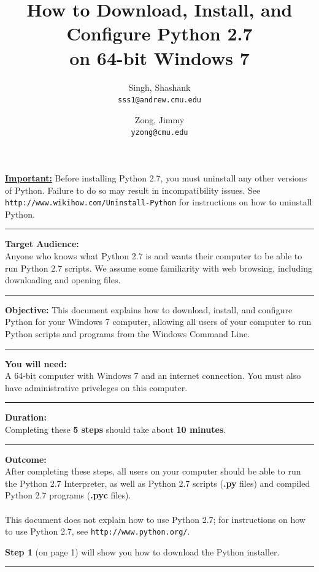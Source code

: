 \documentclass[11pt,english]{article}
\title{How to Download, Install, and Configure Python 2.7\\
on 64-bit Windows 7}
\author{
  Singh, Shashank \\
  \texttt{sss1@andrew.cmu.edu}
  \and
  Zong, Jimmy\\
  \texttt{yzong@cmu.edu}
}
\newcommand{\myhrule}{\vspace{0.3cm}\hrule\vspace{0.3cm}}
\begin{document}
\begin{titlepage}
\maketitle
\vfill
{\bf \color{red} \underline{Important:}} Before installing Python 2.7, you must
uninstall any other versions of Python. Failure to do so may result in
incompatibility issues. See \texttt{http://www.wikihow.com/Uninstall-Python}
for instructions on how to uninstall Python.
\myhrule
{\bf Target Audience:}\\
Anyone who knows what Python 2.7 is and wants their computer to be able to run
Python 2.7 scripts. We assume some familiarity with web browsing, including
downloading and opening files.
\myhrule
{\bf Objective:} This document explains how to download, install, and
configure Python for your Windows 7 computer, allowing all users of your
computer to run Python scripts and programs from the Windows Command Line.
\myhrule
{\bf You will need:}\\
A 64-bit computer with Windows 7 and an internet connection. You must also have
administrative priveleges on this computer.
\myhrule
{\bf Duration:}\\
Completing these {\bf 5 steps} should take about {\bf 10 minutes}.
\myhrule
{\bf Outcome:}\\
After completing these steps, all users on your computer should be able to run
the Python 2.7 Interpreter, as well as Python 2.7 scripts ({\bf .py} files) and
compiled Python 2.7 programs ({\bf .pyc} files).\\\\
This document does not explain how to use Python 2.7; for instructions on how
to use Python 2.7, see \texttt{http://www.python.org/}.
\vspace{2cm}

{\bf Step 1} (on page 1) will show you how to download the Python
installer.
\myhrule
\end{titlepage}
\end{document}
